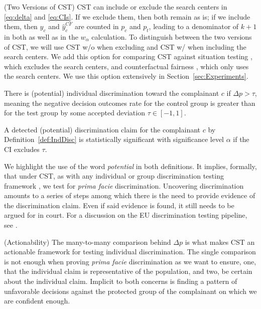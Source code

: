 %
\begin{remark}(Two Versions of CST)
\label{rem:SearchCenters}
    CST can include or exclude the search centers in \eqref{eq:delta} and \eqref{eq:CIs}. 
    If we exclude them, then both remain as is; 
    if we include them, then $\hat{y}_c$ and $\hat{y}_c^{CF}$ are counted in $p_c$ and $p_t$, leading to a denominator of $k + 1$ in both as well as in the $w_{\alpha}$ calculation.
    To distinguish between the two versions of CST, we will use CST w/o when excluding and CST w/ when including the search centers.
    We add this option for comparing CST against situation testing \parencite{Thanh_KnnSituationTesting2011}, which excludes the search centers, and counterfactual fairness \parencite{Kusner2017CF}, which only uses the search centers.
    We use this option extensively in Section~\ref{sec:Experiments}. 
\end{remark}
%

%
\begin{definition}
\label{def:IndDisc}
    There is (potential) individual discrimination toward the complainant $c$ if $\Delta p > \tau$, meaning the negative decision outcomes rate for the control group is greater than for the test group by some accepted deviation $\tau \in [-1, 1]$.
\end{definition}
%

%
\begin{definition}
\label{def:CIs}
    A detected (potential) discrimination claim for the complainant $c$ by Definition~\ref{def:IndDisc}
    is statistically significant with significance level $\alpha$ if the CI
    excludes $\tau$.
\end{definition}
%

We highlight the use of the word \textit{potential} in both definitions. 
It implies, formally, that under CST, as with any individual or group discrimination testing framework \parencite{Romei2014MultiSurveyDiscrimination}, we test for \textit{prima facie} discrimination.
Uncovering discrimination amounts to a series of steps among which there is the need to provide evidence of the discrimination claim. 
Even if said evidence is found, it still needs to be argued for in court.
For a discussion on the EU discrimination testing pipeline, see \textcite{DBLP:conf/fat/WeertsXTOP23}.

%
\begin{remark}(Actionability)
\label{rem:actionability}
    The many-to-many comparison behind $\Delta p$ is what makes CST an actionable framework for testing individual discrimination. 
    The single comparison is not enough when proving \textit{prima facie} discrimination 
    as we want to ensure, one, that the individual claim is representative of the population, and two, be certain about the individual claim.
    Implicit to both concerns is finding a pattern of unfavorable decisions against the protected group of the complainant on which we are confident enough.
\end{remark}
%

